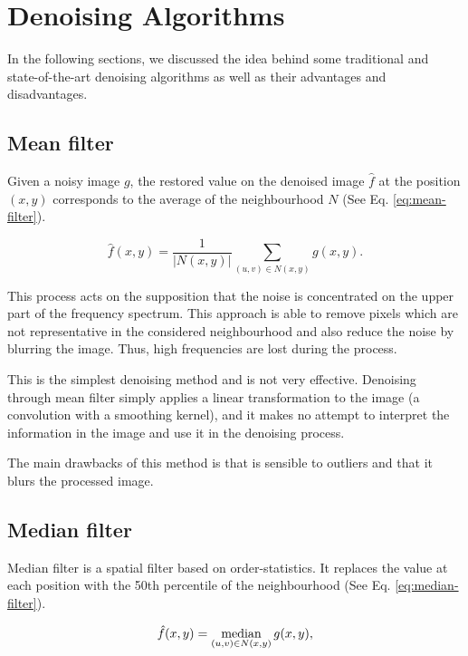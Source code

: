 \section{Denoising Algorithms} \label{sc:state-of-the-art}
In the following sections, we discussed the idea behind some traditional and state-of-the-art denoising algorithms as well as their advantages and disadvantages.

\subsection{Mean filter}

Given a noisy image $g$, the restored value on the denoised image $\hat{f}$ at the position $(x, y)$ corresponds to the average of the neighbourhood $N$ (See Eq. \ref{eq:mean-filter}).

\begin{equation}
	\hat{f}(x, y) = \frac{1}{|N(x, y)|}\sum_{(u, v) \in N(x, y)}{g(x, y)}.
    \label{eq:mean-filter}
\end{equation}

This process acts on the supposition that the noise is concentrated on the upper part of the frequency spectrum. This approach is able to remove pixels which are not representative in the considered neighbourhood and also reduce the noise by blurring the image. Thus, high frequencies are lost during the process.

This is the simplest denoising method and is not very effective. Denoising through mean filter simply applies a linear transformation to the image (a convolution with a smoothing kernel), and it makes no attempt to interpret the information in the image and use it in the denoising process.

The main drawbacks of this method is that is sensible to outliers and that it blurs the processed image.

\subsection{Median filter}

Median filter is a spatial filter based on order-statistics. It replaces the value at each position with the 50th percentile of the neighbourhood (See Eq. \ref{eq:median-filter}). 

\begin{equation}
	\hat{f}(x, y) = \operatorname*{median}\limits_{(u, v) \in N(x, y)}{g(x, y)},
    \label{eq:median-filter}
\end{equation}

